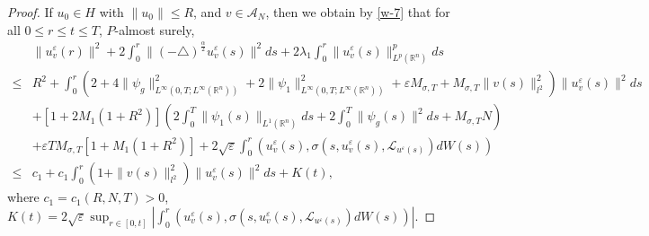 \documentclass[11pt]{article}
\numberwithin{equation}{section}
\theoremstyle{plain}
\def\leq{\leqslant}
\begin{document}
\begin{proof}
    If $u_0 \in H$ with $\|u_0\| \leq R$,
    and $v \in \mathcal{A}_N$,
    then we obtain by \eqref{w-7} that for all  $0 \leq r \leq t \leq T$,
    $P$-almost surely,
    \begin{align}\label{w-8}
        & \|u_v^\varepsilon(r)\|^2
        + 2 \int_0^r \|(-\triangle)^{\frac{\alpha}{2}} u_v^\varepsilon (s) \|^2 ds
        + 2 \lambda_1 \int_{0}^{r} \| u_v^\varepsilon(s) \|_{L^p(\mathbb{R}^n)}^{p} ds
        \nonumber \\
        \leq & R^2
        + \int_{0}^{r}
        \left( 2 + 4 \| \psi_g \|_{L^\infty(0,T; L^\infty(\mathbb{R}^n) ) }^2
        + 2 \| \psi_1 \|_{L^\infty(0,T; L^\infty(\mathbb{R}^n) ) }^2
        + \varepsilon M_{\sigma,T}
        + M_{\sigma,T} \| v(s) \|_{l^2}^2
        \right) \| u_v^\varepsilon(s) \|^2 ds
        \nonumber \\
        & + \left[ 1 + 2 M_1( 1 + R^2 ) \right]
        \left( 2 \int_{0}^{T} \| \psi_1(s) \|_{L^1(\mathbb{R}^n)} ds
        + 2 \int_{0}^{T} \| \psi_g (s) \|^2 ds
        + M_{\sigma,T} N
        \right)
        \nonumber \\
        & + \varepsilon T M_{\sigma,T} \left[ 1 + M_1( 1 + R^2 ) \right]
        + 2 \sqrt{\varepsilon} \int_{0}^{r}
        \left( u_v^\varepsilon (s), \sigma(s, u_v^\varepsilon (s), \mathcal{L}_{u^\varepsilon(s)} ) dW(s) \right)
        \nonumber \\
        \leq & c_1
        + c_1 \int_{0}^{r}
        \left( 1 + \| v(s) \|_{l^2}^2
        \right)
        \| u_v^\varepsilon (s) \|^2
        ds
        + K(t),
    \end{align}
    where $c_1 = c_1 (R, N, T)>0$,
    $K(t)= 2 \sqrt{\varepsilon}
    \sup_{r \in [0, t]}
    \left| \int_{0}^{r}
    \left( u_v^\varepsilon (s), \sigma(s, u_v^\varepsilon (s), \mathcal{L}_{u^\varepsilon(s)} ) dW(s)
    \right)
    \right|.
    $


\end{proof}
\end{document}
